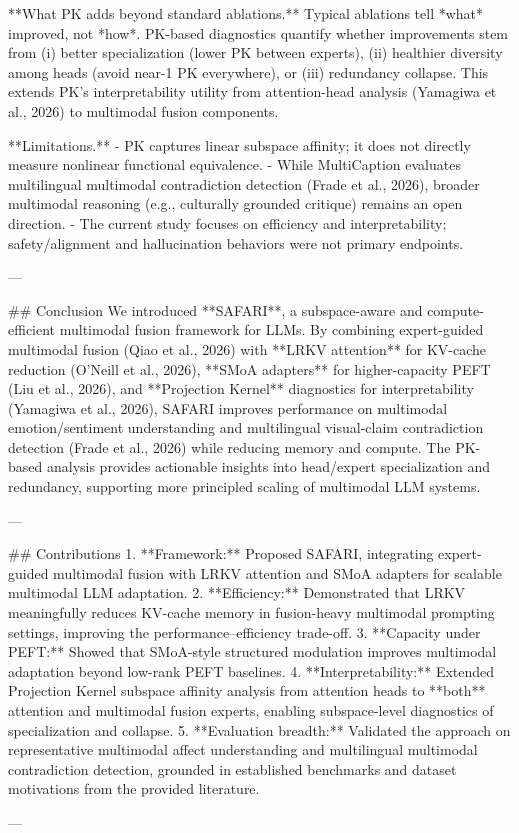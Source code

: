 **What PK adds beyond standard ablations.** Typical ablations tell *what* improved, not *how*. PK-based diagnostics quantify whether improvements stem from (i) better specialization (lower PK between experts), (ii) healthier diversity among heads (avoid near-1 PK everywhere), or (iii) redundancy collapse. This extends PK’s interpretability utility from attention-head analysis (Yamagiwa et al., 2026) to multimodal fusion components.

**Limitations.**  
- PK captures linear subspace affinity; it does not directly measure nonlinear functional equivalence.  
- While MultiCaption evaluates multilingual multimodal contradiction detection (Frade et al., 2026), broader multimodal reasoning (e.g., culturally grounded critique) remains an open direction.  
- The current study focuses on efficiency and interpretability; safety/alignment and hallucination behaviors were not primary endpoints.

---

## Conclusion  
We introduced **SAFARI**, a subspace-aware and compute-efficient multimodal fusion framework for LLMs. By combining expert-guided multimodal fusion (Qiao et al., 2026) with **LRKV attention** for KV-cache reduction (O’Neill et al., 2026), **SMoA adapters** for higher-capacity PEFT (Liu et al., 2026), and **Projection Kernel** diagnostics for interpretability (Yamagiwa et al., 2026), SAFARI improves performance on multimodal emotion/sentiment understanding and multilingual visual-claim contradiction detection (Frade et al., 2026) while reducing memory and compute. The PK-based analysis provides actionable insights into head/expert specialization and redundancy, supporting more principled scaling of multimodal LLM systems.

---

## Contributions  
1. **Framework:** Proposed SAFARI, integrating expert-guided multimodal fusion with LRKV attention and SMoA adapters for scalable multimodal LLM adaptation.  
2. **Efficiency:** Demonstrated that LRKV meaningfully reduces KV-cache memory in fusion-heavy multimodal prompting settings, improving the performance–efficiency trade-off.  
3. **Capacity under PEFT:** Showed that SMoA-style structured modulation improves multimodal adaptation beyond low-rank PEFT baselines.  
4. **Interpretability:** Extended Projection Kernel subspace affinity analysis from attention heads to **both** attention and multimodal fusion experts, enabling subspace-level diagnostics of specialization and collapse.  
5. **Evaluation breadth:** Validated the approach on representative multimodal affect understanding and multilingual multimodal contradiction detection, grounded in established benchmarks and dataset motivations from the provided literature.

---